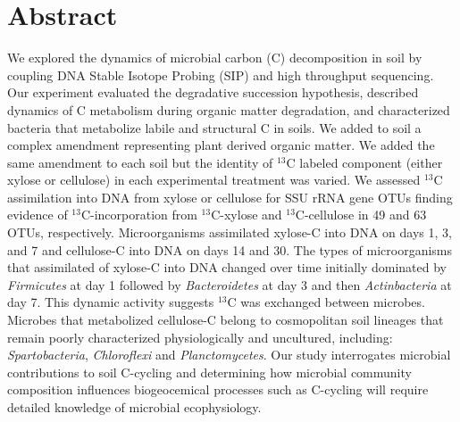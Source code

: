 \section{Abstract} We explored the dynamics of microbial carbon (C)
decomposition in soil by coupling DNA Stable Isotope Probing (SIP) and high
throughput sequencing. Our experiment evaluated the degradative succession
hypothesis, described dynamics of C metabolism during organic matter
degradation, and characterized bacteria that metabolize labile and structural
C in soils. We added to soil a complex amendment representing plant derived
organic matter. We added the same amendment to each soil but the identity of
$^{13}$C labeled component (either xylose or cellulose) in each experimental
treatment was varied. We assessed $^{13}$C assimilation into DNA from xylose or
cellulose for SSU rRNA gene OTUs finding evidence of $^{13}$C-incorporation
from $^{13}$C-xylose and $^{13}$C-cellulose in 49 and 63 OTUs, respectively.
Microorganisms assimilated xylose-C into DNA on days 1, 3, and 7 and
cellulose-C into DNA on days 14 and 30. The types of microorganisms that
assimilated of xylose-C into DNA changed over time initially dominated by
\textit{Firmicutes} at day 1 followed by \textit{Bacteroidetes} at day 3 and
then \textit{Actinbacteria} at day 7. This dynamic activity suggests $^{13}$C
was exchanged between microbes. Microbes that metabolized cellulose-C belong to
cosmopolitan soil lineages that remain poorly characterized physiologically and
uncultured, including: \textit{Spartobacteria}, \textit{Chloroflexi} and
\textit{Planctomycetes}. Our study interrogates microbial contributions to soil
C-cycling and determining how microbial community composition influences
biogeocemical processes such as C-cycling will require detailed knowledge of
microbial ecophysiology.
